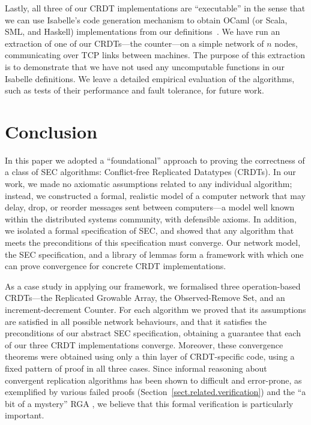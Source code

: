 \documentclass[acmsmall,screen]{acmart}
\begin{document}
Lastly, all three of our CRDT implementations are ``executable'' in the sense that we can use Isabelle's code generation mechanism to obtain OCaml (or Scala, SML, and Haskell) implementations from our definitions~\cite{DBLP:conf/flops/HaftmannN10}.
We have run an extraction of one of our CRDTs---the counter---on a simple network of $n$ nodes, communicating over TCP links between machines.
The purpose of this extraction is to demonstrate that we have not used any uncomputable functions in our Isabelle definitions.
We leave a detailed empirical evaluation of the algorithms, such as tests of their performance and fault tolerance, for future work.

\section{Conclusion}
\label{sect.conclusion}

In this paper we adopted a ``foundational'' approach to proving the correctness of a class of SEC algorithms: Conflict-free Replicated Datatypes (CRDTs).
In our work, we made no axiomatic assumptions related to any individual algorithm; instead, we constructed a formal, realistic model of a computer network that may delay, drop, or reorder messages sent between computers---a model well known within the distributed systems community, with defensible axioms.
In addition, we isolated a formal specification of SEC, and showed that any algorithm that meets the preconditions of this specification must converge.
Our network model, the SEC specification, and a library of lemmas form a framework with which one can prove convergence for concrete CRDT implementations.

As a case study in applying our framework, we formalised three operation-based CRDTs---the Replicated Growable Array, the Observed-Remove Set, and an increment-decrement Counter.
For each algorithm we proved that its assumptions are satisfied in all possible network behaviours, and that it satisfies the preconditions of our abstract SEC specification, obtaining a guarantee that each of our three CRDT implementations converge.
Moreover, these convergence theorems were obtained using only a thin layer of CRDT-specific code, using a fixed pattern of proof in all three cases.
Since informal reasoning about convergent replication algorithms has been shown to difficult and error-prone, as exemplified by various failed proofs (Section~\ref{sect.related.verification}) and the ``a bit of a mystery'' RGA \cite{Attiya:2016kh}, we believe that this formal verification is particularly important.
\end{document}
